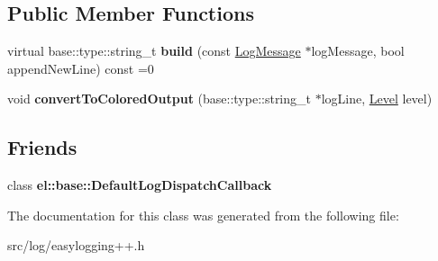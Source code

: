 \subsection*{Public Member Functions}
\begin{DoxyCompactItemize}
\item 
virtual base\+::type\+::string\+\_\+t {\bfseries build} (const \hyperlink{classel_1_1LogMessage}{Log\+Message} $\ast$log\+Message, bool append\+New\+Line) const =0\hypertarget{classel_1_1LogBuilder_a633b373a3bb9d3e17bdd664aeba4dbc8}{}\label{classel_1_1LogBuilder_a633b373a3bb9d3e17bdd664aeba4dbc8}

\item 
void {\bfseries convert\+To\+Colored\+Output} (base\+::type\+::string\+\_\+t $\ast$log\+Line, \hyperlink{namespaceel_ab0ac6091262344c52dd2d3ad099e8e36}{Level} level)\hypertarget{classel_1_1LogBuilder_a229244f323f25bdbd7725f8bbf983a17}{}\label{classel_1_1LogBuilder_a229244f323f25bdbd7725f8bbf983a17}

\end{DoxyCompactItemize}
\subsection*{Friends}
\begin{DoxyCompactItemize}
\item 
class {\bfseries el\+::base\+::\+Default\+Log\+Dispatch\+Callback}\hypertarget{classel_1_1LogBuilder_a42b1de96d584ae4fecbfc2b9aff95052}{}\label{classel_1_1LogBuilder_a42b1de96d584ae4fecbfc2b9aff95052}

\end{DoxyCompactItemize}


The documentation for this class was generated from the following file\+:\begin{DoxyCompactItemize}
\item 
src/log/easylogging++.\+h\end{DoxyCompactItemize}
